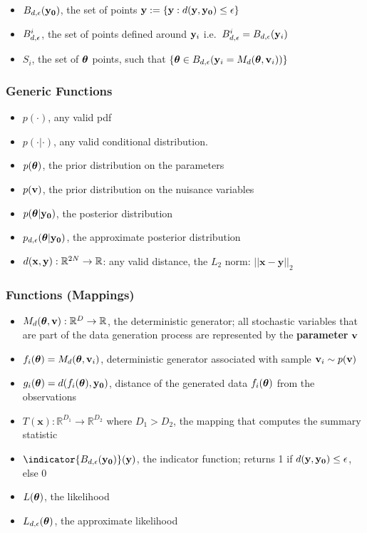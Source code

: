 \begin{itemize}
\item $B_{d,\epsilon}(\mathbf{y_0})$, the set of points $\mathbf{y} := \{\mathbf{y}: d(\mathbf{y}, \mathbf{y_0}) \leq \epsilon \}$
\item $B_{d,\epsilon}^i$, the set of points defined around $\mathbf{y}_i$ i.e.\ $B_{d,\epsilon}^i = B_{d,\epsilon}(\mathbf{y}_i)$
\item $S_i$, the set of $\boldsymbol{\theta}$ points, such that $\{ \boldsymbol{\theta} \in B_{d,\epsilon}(\mathbf{y}_i=M_d(\boldsymbol{\theta}, \mathbf{v}_i)) \}$
\end{itemize}
    
\subsubsection*{Generic Functions}
\label{sec:generic-functions}

\begin{itemize}
\item $p(\cdot)$, any valid pdf
\item $p(\cdot | \cdot)$, any valid conditional distribution.
\item $p(\boldsymbol{\theta})$, the prior distribution on the parameters
\item $p(\mathbf{v})$, the prior distribution on the nuisance variables
\item $p(\boldsymbol{\theta}|\mathbf{y_0})$, the posterior distribution
\item $p_{d,\epsilon}(\boldsymbol{\theta}|\mathbf{y_0})$, the approximate posterior
  distribution  
\item $d(\mathbf{x}, \mathbf{y}): \mathbb{R}^{2N} \rightarrow \mathbb{R}$: any valid
  distance, the $L_2$ norm: $||\mathbf{x}-\mathbf{y}||_2$
\end{itemize}

\subsubsection*{Functions (Mappings)}
\label{sec:functions-mappings}

\begin{itemize}
\item $M_d(\boldsymbol{\theta}, \mathbf{v}): \mathbb{R}^D \rightarrow \mathbb{R}$, the deterministic
  generator; all stochastic variables that are part of the data generation process are represented by the \textbf{parameter} $\mathbf{v}$
\item $f_i(\boldsymbol{\theta}) = M_d(\boldsymbol{\theta}, \mathbf{v}_i)$, deterministic generator associated with sample $\mathbf{v}_i \sim p(\mathbf{v})$
\item $g_i(\boldsymbol{\theta}) = d(f_i(\boldsymbol{\theta}), \mathbf{y_0})$, distance of the generated data $f_i(\boldsymbol{\theta})$ from the observations
\item $T(\mathbf{x}): \mathbb{R}^{D_1} \rightarrow \mathbb{R}^{D_2}$
  where $D_1 > D_2$, the mapping that computes the summary statistic
\item $\indicator{\region(\data)}(\yb)$, the indicator function; returns 1 if $d(\mathbf{y}, \mathbf{y_0}) \leq \epsilon$, else 0
\item $L(\boldsymbol{\theta})$, the likelihood
\item $L_{d,\epsilon}(\boldsymbol{\theta})$, the approximate likelihood
\end{itemize}

